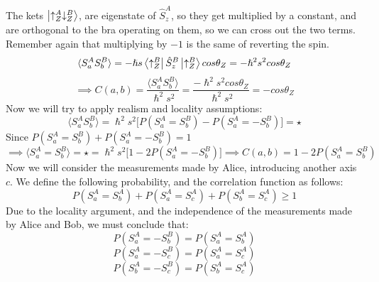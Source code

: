 \documentclass{article}
\begin{document}
The kets $\ket{\uparrow^A_Z \downarrow^B_Z}$, are eigenstate of $\hat{S}_z^A$, so they get multiplied by a constant, and are orthogonal to the bra operating on them, so we can cross out the two terms. Remember again that multiplying by $-1$ is the same of reverting the spin.
$$\langle S_a^AS_b^B \rangle =  - \hslash s \bra{\uparrow_Z^B} \hat{S}_z^B \ket{\uparrow_Z^B}cos\theta_Z = - \hslash^2 s^2 cos\theta_Z$$
$$\implies C(a,b) = \frac{\langle S_a^AS_b^B \rangle}{\hslash^2 s^2} = \frac{- \hslash^2 s^2 cos\theta_Z}{\hslash^2 s^2}= - cos\theta_Z$$
Now we will try to apply realism and locality assumptions:
$$\langle S_a^AS_b^B \rangle = \hslash^2s^2 \bigl[ P(S_a^A= S_b^B)-P(S_a^A=-S_b^B) \bigl] = \star $$
Since $P(S_a^A = S_b^B) + P(S_a^A = -S_b^B) =1$
$$\implies \langle S_a^A=S_b^B \rangle = \star = \hslash^2s^2\bigl[ 1-2P(S_a^A=-S_b^B)] \implies C(a,b) = 1-2P(S_a^A=S_b^B)$$
Now we will consider the measurements made by Alice, introducing another axis $c$. We define the following probability, and the correlation function as follows:
$$P(S_a^A=S_b^A)+P(S_a^A=S_c^A)+P(S_b^A=S_c^A) \geq 1$$
Due to the locality argument, and the independence of the measurements made by Alice and Bob, we must conclude that:
$$P(S_a^A=-S_b^B) = P(S_a^A=S_b^A)$$
$$P(S_a^A=-S_c^B) = P(S_a^A=S_c^A)$$
$$P(S_b^A=-S_c^B) = P(S_b^A=S_c^A)$$
\end{document}
